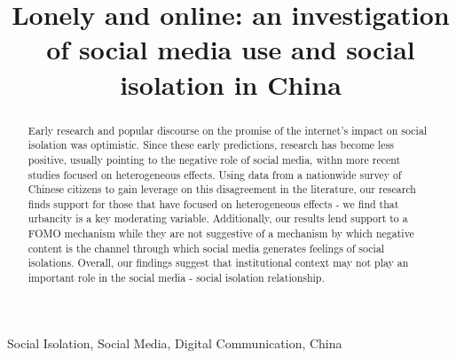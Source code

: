 \documentclass[]{interact}
\theoremstyle{plain}%
\theoremstyle{definition}
\theoremstyle{remark}
\begin{document}
\title{Lonely and online: an investigation of social media use and
social isolation in China}



\author{
}

%


\maketitle

\begin{abstract}
Early research and popular discourse on the promise of the internet's
impact on social isolation was optimistic. Since these early
predictions, research has become less positive, usually pointing to the
negative role of social media, withn more recent studies focused on
heterogeneous effects. Using data from a nationwide survey of Chinese
citizens to gain leverage on this disagreement in the literature, our
research finds support for those that have focused on heterogeneous
effects - we find that urbancity is a key moderating variable.
Additionally, our results lend support to a FOMO mechanism while they
are not suggestive of a mechanism by which negative content is the
channel through which social media generates feelings of social
isolations. Overall, our findings suggest that institutional context may
not play an important role in the social media - social isolation
relationship.
\end{abstract}

\begin{keywords}
    Social Isolation, Social Media, Digital Communication, 
    China
\end{keywords}\ifdefined\Shaded\renewenvironment{Shaded}{\begin{tcolorbox}[borderline west={3pt}{0pt}{shadecolor}, sharp corners, boxrule=0pt, frame hidden, enhanced, breakable, interior hidden]}{\end{tcolorbox}}\fi
\end{document}

